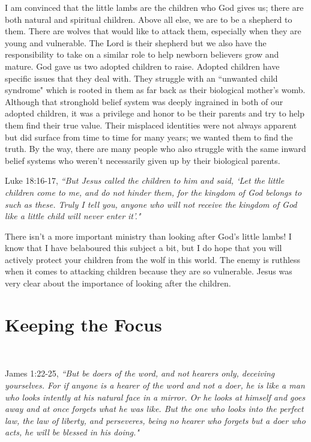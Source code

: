 \documentclass[oneside,12pt]{book}
\begin{document}
I am convinced that the little lambs are the children who God gives us; there are both natural and spiritual children. Above all else, we are to be a shepherd to them. There are wolves that would like to attack them, especially when they are young and vulnerable. The Lord is their shepherd but we also have the responsibility to take on a similar role to help newborn believers grow and mature. God gave us two adopted children to raise. Adopted children have specific issues that they deal with. They struggle with an ``unwanted child syndrome" which is rooted in them as far back as their biological mother's womb. Although that stronghold belief system was deeply ingrained in both of our adopted children, it was a privilege and honor to be their parents and try to help them find their true value. Their misplaced identities were not always apparent but did surface from time to time for many years; we wanted them to find the truth. By the way, there are many people who also struggle with the same inward belief systems who weren't necessarily given up by their biological parents.

Luke 18:16-17, \textit{``But Jesus called the children to him and said, `Let the little children come to me, and do not hinder them, for the kingdom of God belongs to such as these. Truly I tell you, anyone who will not receive the kingdom of God like a little child will never enter it'."}  

There isn't a more important ministry than looking after God's little lambs! I know that I have belaboured this subject a bit, but I do hope that you will actively protect your children from the wolf in this world. The enemy is ruthless when it comes to attacking children because they are so vulnerable. Jesus was very clear about the importance of looking after the children.


\chapter{Keeping the Focus}
\

James 1:22-25, \textit{``But be doers of the word, and not hearers only, deceiving yourselves. For if anyone is a hearer of the word and not a doer, he is like a man who looks intently at his natural face in a mirror. Or he looks at himself and goes away and at once forgets what he was like. But the one who looks into the perfect law, the law of liberty, and perseveres, being no hearer who forgets but a doer who acts, he will be blessed in his doing."}
\end{document}
